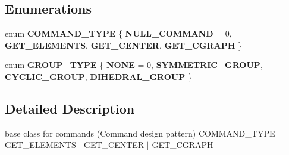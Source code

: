 \subsection*{\-Enumerations}
\begin{DoxyCompactItemize}
\item 
enum {\bfseries \-C\-O\-M\-M\-A\-N\-D\-\_\-\-T\-Y\-P\-E} \{ {\bfseries \-N\-U\-L\-L\-\_\-\-C\-O\-M\-M\-A\-N\-D} =  0, 
{\bfseries \-G\-E\-T\-\_\-\-E\-L\-E\-M\-E\-N\-T\-S}, 
{\bfseries \-G\-E\-T\-\_\-\-C\-E\-N\-T\-E\-R}, 
{\bfseries \-G\-E\-T\-\_\-\-C\-G\-R\-A\-P\-H}
 \}
\item 
enum {\bfseries \-G\-R\-O\-U\-P\-\_\-\-T\-Y\-P\-E} \{ {\bfseries \-N\-O\-N\-E} =  0, 
{\bfseries \-S\-Y\-M\-M\-E\-T\-R\-I\-C\-\_\-\-G\-R\-O\-U\-P}, 
{\bfseries \-C\-Y\-C\-L\-I\-C\-\_\-\-G\-R\-O\-U\-P}, 
{\bfseries \-D\-I\-H\-E\-D\-R\-A\-L\-\_\-\-G\-R\-O\-U\-P}
 \}
\end{DoxyCompactItemize}


\subsection{\-Detailed \-Description}
base class for commands (\-Command design pattern) \-C\-O\-M\-M\-A\-N\-D\-\_\-\-T\-Y\-P\-E = \-G\-E\-T\-\_\-\-E\-L\-E\-M\-E\-N\-T\-S $|$ \-G\-E\-T\-\_\-\-C\-E\-N\-T\-E\-R $|$ \-G\-E\-T\-\_\-\-C\-G\-R\-A\-P\-H 